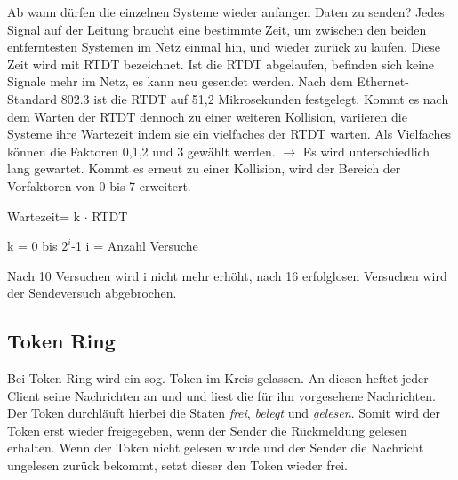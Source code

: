\documentclass[12pt,a4paper]{article}
\begin{document}
			Ab wann dürfen die einzelnen Systeme wieder anfangen Daten zu senden?\newline\newline
			Jedes Signal auf der Leitung braucht eine bestimmte Zeit, um zwischen den beiden entferntesten Systemen im Netz einmal hin, und wieder zurück zu laufen. Diese Zeit wird mit RTDT bezeichnet. Ist die RTDT abgelaufen, befinden sich keine Signale mehr im Netz, es kann neu gesendet werden. \newline\newline
			Nach dem Ethernet-Standard 802.3 ist die RTDT auf 51,2 Mikrosekunden festgelegt.\newline\newline
			Kommt es nach dem Warten der RTDT dennoch zu einer weiteren Kollision, variieren die Systeme ihre Wartezeit indem sie ein vielfaches der RTDT warten. Als Vielfaches können die Faktoren 0,1,2 und 3 gewählt werden.\newline
			$\longrightarrow$ Es wird unterschiedlich lang gewartet. \newline\newline
			Kommt es erneut zu einer Kollision, wird der Bereich der Vorfaktoren von 0 bis 7 erweitert.
			\begin{center}
				Wartezeit= k $\cdot$ RTDT
			\end{center}
			\begin{center}
				k = 0 bis $2^{i}$-1 \hspace{2cm} i = Anzahl Versuche
			\end{center}
			Nach 10 Versuchen wird i nicht mehr erhöht, nach 16 erfolglosen Versuchen wird der Sendeversuch abgebrochen.

		\subsection{Token Ring}
			Bei Token Ring wird ein sog. Token im Kreis gelassen. An diesen heftet jeder Client seine Nachrichten an und und liest die für ihn vorgesehene Nachrichten. Der Token durchläuft hierbei die Staten \textit{frei}, \textit{belegt} und \textit{gelesen}. Somit wird der Token erst wieder freigegeben, wenn der Sender die Rückmeldung gelesen erhalten. Wenn der Token nicht gelesen wurde und der Sender die Nachricht ungelesen zurück bekommt, setzt dieser den Token wieder frei.
			
\end{document}
